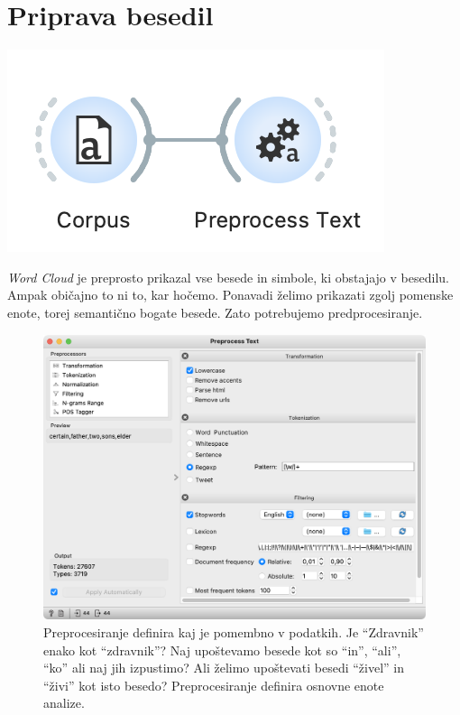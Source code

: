\chapter{Priprava besedil}
\label{ch:priprava-besedil}

\begin{marginfigure}[2cm]
  \includegraphics[width=0.9\linewidth]{workflow.png}
  \caption{}
\end{marginfigure}

\textit{Word Cloud} je preprosto prikazal vse besede in simbole, ki obstajajo v besedilu. Ampak običajno to ni to, kar hočemo. Ponavadi želimo prikazati zgolj pomenske enote, torej semantično bogate besede. Zato potrebujemo predprocesiranje.

\begin{figure}[h]
  \includegraphics[width=\linewidth]{preprocess.png}%
  \caption{Preprocesiranje definira kaj je pomembno v podatkih. Je ``Zdravnik'' enako kot ``zdravnik''? Naj upoštevamo besede kot so ``in'', ``ali'', ``ko'' ali naj jih izpustimo? Ali želimo upoštevati besedi ``živel'' in ``živi'' kot isto besedo? Preprocesiranje definira osnovne enote analize.}
  \label{fig:002-preprocess}
\end{figure}

